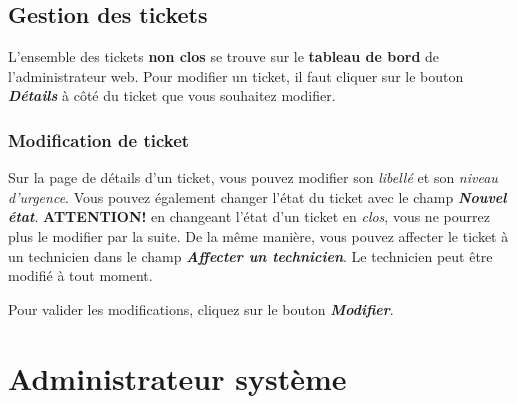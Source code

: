 \documentclass[12pt, a4paper]{article}
\begin{document}
\subsection*{Gestion des tickets}

L'ensemble des tickets \textbf{non clos} se trouve sur le \textbf{tableau de bord} de l'administrateur web.
Pour modifier un ticket, il faut cliquer sur le bouton \textit{\textbf{Détails}} à côté du ticket que vous souhaitez modifier.

\subsubsection*{Modification de ticket}

Sur la page de détails d'un ticket, vous pouvez modifier son \textit{libellé} et son \textit{niveau d'urgence}.
Vous pouvez également changer l'état du ticket avec le champ \textit{\textbf{Nouvel état}}.
\textbf{ATTENTION!} en changeant l'état d'un ticket en \textit{clos}, vous ne pourrez plus le modifier par la suite.
De la même manière, vous pouvez affecter le ticket à un technicien dans le champ \textit{\textbf{Affecter un technicien}}.
Le technicien peut être modifié à tout moment.

\bigskip
\noindent Pour valider les modifications, cliquez sur le bouton \textit{\textbf{Modifier}}.

\section{Administrateur système}
\end{document}
